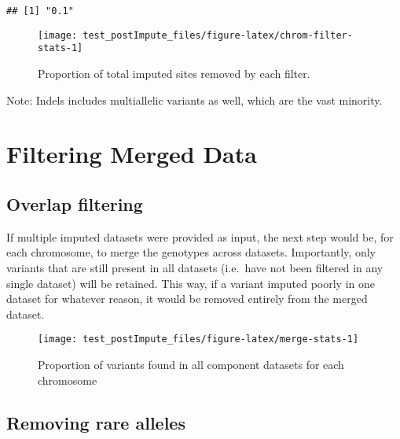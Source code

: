 \documentclass[]{article}
\begin{document}
\begin{verbatim}
## [1] "0.1"
\end{verbatim}

\begin{figure}[H]

{\centering \texttt{[image: test\_postImpute\_files/figure-latex/chrom-filter-stats-1]} 

}

\caption{Proportion of total imputed sites removed by each filter.}\label{fig:chrom-filter-stats}
\end{figure}

Note: Indels includes multiallelic variants as well, which are the vast
minority.

\newpage

\hypertarget{filtering-merged-data}{%
\section{Filtering Merged Data}\label{filtering-merged-data}}

\hypertarget{overlap-filtering}{%
\subsection{Overlap filtering}\label{overlap-filtering}}

If multiple imputed datasets were provided as input, the next step would
be, for each chromosome, to merge the genotypes across datasets.
Importantly, only variants that are still present in all datasets
(i.e.~have not been filtered in any single dataset) will be retained.
This way, if a variant imputed poorly in one dataset for whatever
reason, it would be removed entirely from the merged dataset.

\begin{figure}[H]

{\centering \texttt{[image: test\_postImpute\_files/figure-latex/merge-stats-1]} 

}

\caption{Proportion of variants found in all component datasets for each chromosome}\label{fig:merge-stats}
\end{figure}

\newpage

\hypertarget{removing-rare-alleles}{%
\subsection{Removing rare alleles}\label{removing-rare-alleles}}
\end{document}
